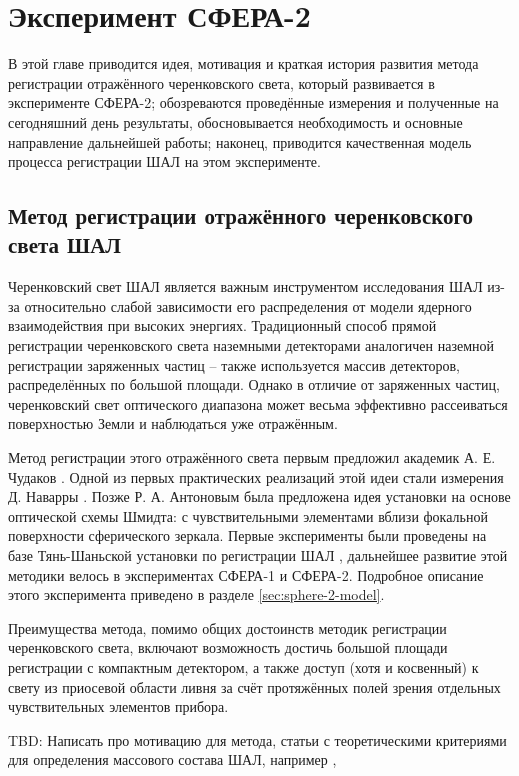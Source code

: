 \chapter{Эксперимент СФЕРА-2}

В этой главе приводится идея, мотивация и краткая история развития метода регистрации отражённого черенковского света, который развивается в эксперименте СФЕРА-2; обозреваются проведённые измерения и полученные на сегодняшний день результаты, обосновывается необходимость и основные направление дальнейшей работы; наконец, приводится качественная модель процесса регистрации ШАЛ на этом эксперименте.

\section{Метод регистрации отражённого черенковского света ШАЛ}

Черенковский свет ШАЛ является важным инструментом исследования ШАЛ из-за относительно слабой зависимости его распределения от модели ядерного взаимодействия при высоких энергиях. Традиционный способ прямой регистрации черенковского света наземными детекторами аналогичен наземной регистрации заряженных частиц -- также используется массив детекторов, распределённых по большой площади. Однако в отличие от заряженных частиц, черенковский свет оптического диапазона может весьма эффективно рассеиваться поверхностью Земли и наблюдаться уже отражённым.

Метод регистрации этого отражённого света первым предложил академик А. Е. Чудаков \cite{Чудаков1972}. Одной из первых практических реализаций этой идеи стали измерения Д. Наварры \cite{Navarra1981}. Позже Р. А. Антоновым была предложена идея установки на основе оптической схемы Шмидта: с чувствительными элементами вблизи фокальной поверхности сферического зеркала. Первые эксперименты были проведены на базе Тянь-Шаньской установки по регистрации ШАЛ \cite{chernov2015-overview}, дальнейшее развитие этой методики велось в экспериментах СФЕРА-1 и СФЕРА-2. Подробное описание этого эксперимента приведено в разделе \ref{sec:sphere-2-model}.

Преимущества метода, помимо общих достоинств методик регистрации черенковского света, включают возможность достичь большой площади регистрации с компактным детектором, а также доступ (хотя и косвенный) к свету из приосевой области ливня за счёт протяжённых полей зрения отдельных чувствительных элементов прибора.

TBD: Написать про мотивацию для метода, статьи с теоретическими критериями для определения массового состава ШАЛ, например \cite{Anokhina2007}, \cite{Chernov2017-ICRC}

